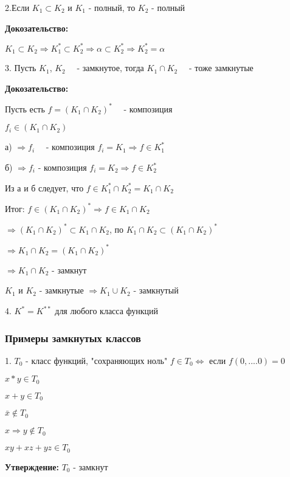 \documentclass[russian]{lecture-notes}
\begin{document}
	2.Если $K_{1} \subset K_{2}$ и $K_{1}$ - полный, то $K_{2}$ - полный

	\textbf{Докозательство:}

	$K_{1} \subset K_{2} \Rightarrow K_{1}^{*} \subset K_{2}^{*} \Rightarrow \alpha
	 \subset K_{2}^{*} \Rightarrow K_{2}^{*} = \alpha
	$

	3. Пусть $K_{1}$, $K_{2}$ ~~- замкнутое, тогда $K_{1} \cap K_{2}$ ~~- тоже замкнутые

	\textbf{Докозательство:}

	Пусть есть $f = (K_{1} \cap K_{2})^{*} $ ~~- композиция

	$f_i \in (K_{1} \cap K_{2})$

	а) $\Rightarrow f_i $ ~~- композиция $ f_i = K_1 \Rightarrow f \in K_{1}^{*}$

	б) $\Rightarrow f_i $ - композиция $f_i = K_2 \Rightarrow f \in K_{2}^{*}$

	Из а и б следует, что $ f \in K_{1}^{*} \cap K_{2}^{*} = K_{1} \cap K_{2}$

	Итог: $f \in (K_{1} \cap K_{2})^{*} \Rightarrow f \in K_{1} \cap K_{2}$ 

	$\Rightarrow	(K_{1} \cap K_{2})^{*} \subset K_{1} \cap K_{2}$, 
	по $K_{1} \cap K_{2} \subset (K_{1}
	\cap K_{2})^{*}$ 
	
	$\Rightarrow K_{1} \cap K_{2} = (K_{1} \cap K_{2})^{*}$
	
	$\Rightarrow K_{1} \cap K_{2} $ - замкнут

	\begin{remark}
		$K_{1}$ и $K_{2}$ - замкнутые $\Rightarrow K_{1} \cup K_{2} $ - замкнутый
		\end{remark}

	4. $K^{*} = K^{**}$ для любого класса функций

	\subsubsection{Примеры замкнутых классов}

	1. $T_{0}$ - класс функций, "сохраняющих ноль" $f \in T_{0} \Leftrightarrow$  если
	$f(0,....0) = 0$

	$x*y \in T_{0}$

	$x+y \in T_{0}$

	$\bar{x} \notin T_{0}$

	$x \Rightarrow y \notin T_{0}$

	$xy + xz + yz \in T_{0}$

	\textbf{Утверждение:} $T_{0} $ - замкнут
\end{document}
